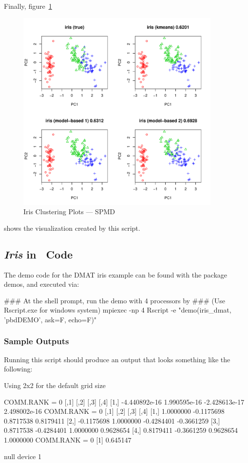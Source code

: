 Finally, figure~\ref{fig:iris_cluster_spmd}
\begin{figure}[h!bt]
  \centering
  \includegraphics[width=4in]{pbdDEMO-include/pics/spmd_plot.pdf}
  \caption{Iris Clustering Plots --- SPMD}
  \label{fig:iris_cluster_spmd}
\end{figure}
shows the visualization created by this script.













\subsection{{\it Iris} in \ Code}

The demo code for the DMAT iris example can be found with the package demos, and executed via:
\begin{Command}
### At the shell prompt, run the demo with 4 processors by
### (Use Rscript.exe for windows system)
mpiexec -np 4 Rscript -e "demo(iris_dmat, 'pbdDEMO', ask=F, echo=F)"
\end{Command}


\subsubsection{Sample Outputs}
Running this script should produce an output that looks something like the following:
\begin{Output}
Using 2x2 for the default grid size

COMM.RANK = 0
              [,1]         [,2]          [,3]         [,4]
[1,] -4.440892e-16 1.990595e-16 -2.428613e-17 2.498002e-16
COMM.RANK = 0
           [,1]       [,2]       [,3]       [,4]
[1,]  1.0000000 -0.1175698  0.8717538  0.8179411
[2,] -0.1175698  1.0000000 -0.4284401 -0.3661259
[3,]  0.8717538 -0.4284401  1.0000000  0.9628654
[4,]  0.8179411 -0.3661259  0.9628654  1.0000000
COMM.RANK = 0
[1] 0.645147

null device 
          1 
\end{Output}

